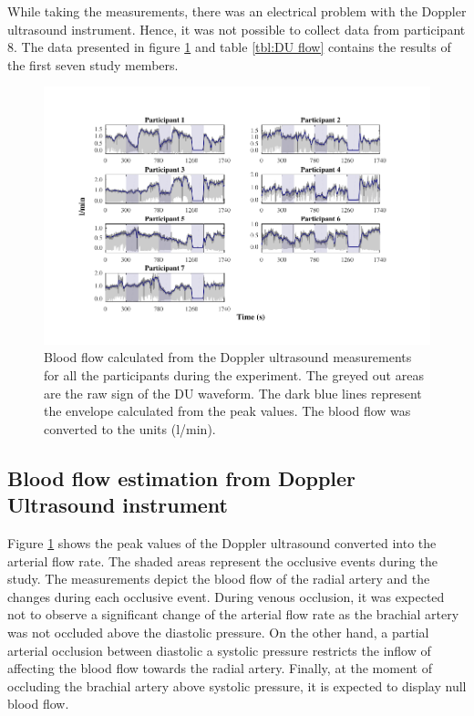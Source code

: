 While taking the measurements, there was an electrical problem with the Doppler ultrasound instrument. Hence, it was not possible to collect data from participant 8. The data presented in figure \ref{fig:DU flow} and table \ref{tbl:DU flow} contains the results of the first seven study members.

\begin{figure}[!htb]
	\includegraphics[width=\textwidth,keepaspectratio,trim={1cm 0cm 1.5cm 0cm},clip]{figure_cmp_2}    
	\caption[Blood flow calculated from Doppler ultrasond device all along the whole expetiment]{Blood flow calculated from the Doppler ultrasound measurements for all the participants during the experiment. The greyed out areas are the raw sign of the DU waveform. The dark blue lines represent the envelope calculated from the peak values. The blood flow was converted to the units (\si[per-mode=symbol]{\litre\per\minute}).}
	\label{fig:DU flow}
\end{figure}

\subsection{Blood flow estimation from Doppler Ultrasound instrument}
\label{section comparison 2.1}
Figure \ref{fig:DU flow} shows the peak values of the Doppler ultrasound converted into the arterial flow rate. The shaded areas represent the occlusive events during the study. The measurements depict the blood flow of the radial artery and the changes during each occlusive event. During venous occlusion, it was expected not to observe a significant change of the arterial flow rate as the brachial artery was not occluded above the diastolic pressure. On the other hand, a partial arterial occlusion between diastolic a systolic pressure restricts the inflow of affecting the blood flow towards the radial artery. Finally, at the moment of occluding the brachial artery above systolic pressure, it is expected to display null blood flow.

